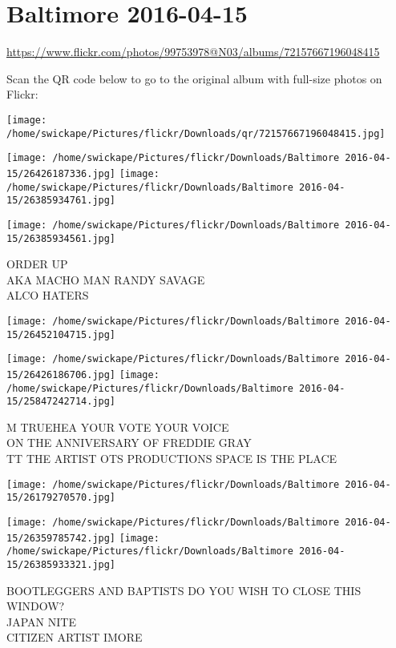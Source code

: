 \documentclass[10pt,letterpaper]{article}
\title{}
\author{}
\date{}
\begin{document}
\section*{Baltimore 2016-04-15}

\url{https://www.flickr.com/photos/99753978@N03/albums/72157667196048415}

Scan the QR code below to go to the original album with full-size photos on Flickr:

\texttt{[image: /home/swickape/Pictures/flickr/Downloads/qr/72157667196048415.jpg]}
\pagebreak

\texttt{[image: /home/swickape/Pictures/flickr/Downloads/Baltimore 2016-04-15/26426187336.jpg]}
\texttt{[image: /home/swickape/Pictures/flickr/Downloads/Baltimore 2016-04-15/26385934761.jpg]}

\texttt{[image: /home/swickape/Pictures/flickr/Downloads/Baltimore 2016-04-15/26385934561.jpg]}

ORDER UP\\
AKA MACHO MAN RANDY SAVAGE\\
ALCO HATERS
\pagebreak

\texttt{[image: /home/swickape/Pictures/flickr/Downloads/Baltimore 2016-04-15/26452104715.jpg]}

\vspace{0.25in}
\texttt{[image: /home/swickape/Pictures/flickr/Downloads/Baltimore 2016-04-15/26426186706.jpg]}
\texttt{[image: /home/swickape/Pictures/flickr/Downloads/Baltimore 2016-04-15/25847242714.jpg]}

M TRUEHEA YOUR VOTE YOUR VOICE\\
ON THE ANNIVERSARY OF FREDDIE GRAY\\
TT THE ARTIST OTS PRODUCTIONS SPACE IS THE PLACE
\pagebreak

\texttt{[image: /home/swickape/Pictures/flickr/Downloads/Baltimore 2016-04-15/26179270570.jpg]}

\vspace{0.25in}
\texttt{[image: /home/swickape/Pictures/flickr/Downloads/Baltimore 2016-04-15/26359785742.jpg]}
\texttt{[image: /home/swickape/Pictures/flickr/Downloads/Baltimore 2016-04-15/26385933321.jpg]}

BOOTLEGGERS AND BAPTISTS DO YOU WISH TO CLOSE THIS WINDOW?\\
JAPAN NITE\\
CITIZEN ARTIST IMORE
\pagebreak
\end{document}
